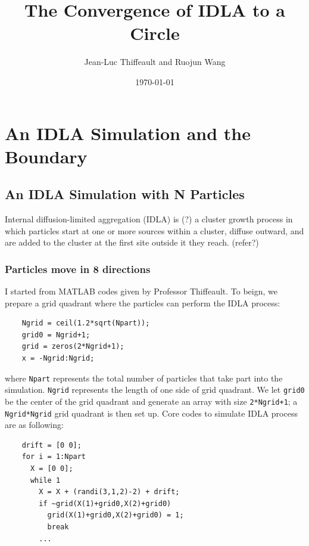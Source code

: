 \documentclass[letterpaper]{article}
\title{	
	\normalfont \normalsize 
	\huge The Convergence of IDLA to a Circle \\ %
}
\author{Jean-Luc Thiffeault and Ruojun Wang} %
\date{\normalsize\today} %
\numberwithin{equation}{section} %
\numberwithin{figure}{section} %
\numberwithin{table}{section} %
\begin{document}
	
\maketitle %
	

\section{An IDLA Simulation and the Boundary}

\subsection{An IDLA Simulation with N Particles}

Internal diffusion-limited aggregation (IDLA) is (?) a cluster growth process in which particles start at one or more sources within a cluster, diffuse outward, and are added to the cluster at the first site outside it they reach. (refer?) 

\subsubsection{Particles move in 8 directions}
I started from  MATLAB codes given by Professor Thiffeault. To beign, we prepare a grid quadrant where the particles can perform the IDLA process:

\begin{lstlisting}
    Ngrid = ceil(1.2*sqrt(Npart)); 
	grid0 = Ngrid+1;                
	grid = zeros(2*Ngrid+1);
	x = -Ngrid:Ngrid;
\end{lstlisting}



\noindent
where \texttt{Npart} represents the total number of particles that take part into the simulation. \texttt{Ngrid} represents the length of one side of grid quadrant. We let \texttt{grid0} be the center of the grid quadrant and generate an array with size \texttt{2*Ngrid+1}; a \texttt{Ngrid*Ngrid} grid quadrant is then set up. Core codes to simulate IDLA process are as following: 

\begin{lstlisting}
    drift = [0 0];
    for i = 1:Npart
	  X = [0 0];
      while 1
	    X = X + (randi(3,1,2)-2) + drift;	    
	    if ~grid(X(1)+grid0,X(2)+grid0)
	      grid(X(1)+grid0,X(2)+grid0) = 1;
	      break
        ...
\end{lstlisting}
\end{document}

